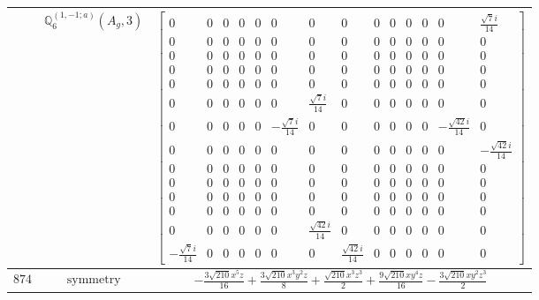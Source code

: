 \documentclass[fleqn,8pt,landscape]{jsarticle}
\begin{document}
\begin{longtable}{ccc}
$  $ & $ \mathbb{Q}_{6}^{(1,-1;a)}(A_{g},3) $ & $ \begin{bmatrix} 0 & 0 & 0 & 0 & 0 & 0 & 0 & 0 & 0 & 0 & 0 & 0 & 0 & \frac{\sqrt{7} i}{14} \\ 0 & 0 & 0 & 0 & 0 & 0 & 0 & 0 & 0 & 0 & 0 & 0 & 0 & 0 \\ 0 & 0 & 0 & 0 & 0 & 0 & 0 & 0 & 0 & 0 & 0 & 0 & 0 & 0 \\ 0 & 0 & 0 & 0 & 0 & 0 & 0 & 0 & 0 & 0 & 0 & 0 & 0 & 0 \\ 0 & 0 & 0 & 0 & 0 & 0 & 0 & 0 & 0 & 0 & 0 & 0 & 0 & 0 \\ 0 & 0 & 0 & 0 & 0 & 0 & \frac{\sqrt{7} i}{14} & 0 & 0 & 0 & 0 & 0 & 0 & 0 \\ 0 & 0 & 0 & 0 & 0 & - \frac{\sqrt{7} i}{14} & 0 & 0 & 0 & 0 & 0 & 0 & - \frac{\sqrt{42} i}{14} & 0 \\ 0 & 0 & 0 & 0 & 0 & 0 & 0 & 0 & 0 & 0 & 0 & 0 & 0 & - \frac{\sqrt{42} i}{14} \\ 0 & 0 & 0 & 0 & 0 & 0 & 0 & 0 & 0 & 0 & 0 & 0 & 0 & 0 \\ 0 & 0 & 0 & 0 & 0 & 0 & 0 & 0 & 0 & 0 & 0 & 0 & 0 & 0 \\ 0 & 0 & 0 & 0 & 0 & 0 & 0 & 0 & 0 & 0 & 0 & 0 & 0 & 0 \\ 0 & 0 & 0 & 0 & 0 & 0 & 0 & 0 & 0 & 0 & 0 & 0 & 0 & 0 \\ 0 & 0 & 0 & 0 & 0 & 0 & \frac{\sqrt{42} i}{14} & 0 & 0 & 0 & 0 & 0 & 0 & 0 \\ - \frac{\sqrt{7} i}{14} & 0 & 0 & 0 & 0 & 0 & 0 & \frac{\sqrt{42} i}{14} & 0 & 0 & 0 & 0 & 0 & 0 \end{bmatrix} $ \\ \hline
$ 874 $ & $ \text{symmetry} $ & $ - \frac{3 \sqrt{210} x^{5} z}{16} + \frac{3 \sqrt{210} x^{3} y^{2} z}{8} + \frac{\sqrt{210} x^{3} z^{3}}{2} + \frac{9 \sqrt{210} x y^{4} z}{16} - \frac{3 \sqrt{210} x y^{2} z^{3}}{2} $ \\

\end{longtable}
\end{document}
